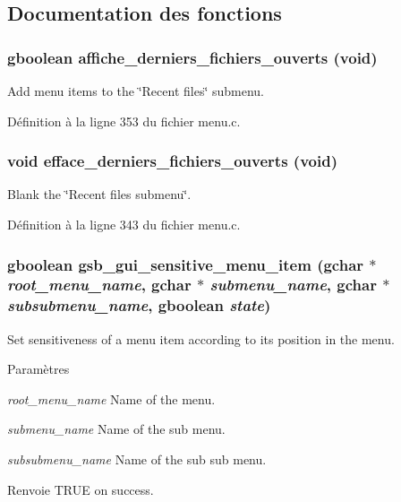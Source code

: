 \subsection{Documentation des fonctions}
\subsubsection[{affiche\_\-derniers\_\-fichiers\_\-ouverts}]{\setlength{\rightskip}{0pt plus 5cm}gboolean affiche\_\-derniers\_\-fichiers\_\-ouverts (void)}\label{menu_8c_a7b48dc605d99995e31545dc3bdad1d85}
Add menu items to the \char`\"{}Recent files\char`\"{} submenu. 

Définition à la ligne 353 du fichier menu.c.

\subsubsection[{efface\_\-derniers\_\-fichiers\_\-ouverts}]{\setlength{\rightskip}{0pt plus 5cm}void efface\_\-derniers\_\-fichiers\_\-ouverts (void)}\label{menu_8c_a31e1f092a06fca742e15442a4fd44313}
Blank the \char`\"{}Recent files submenu\char`\"{}. 

Définition à la ligne 343 du fichier menu.c.

\subsubsection[{gsb\_\-gui\_\-sensitive\_\-menu\_\-item}]{\setlength{\rightskip}{0pt plus 5cm}gboolean gsb\_\-gui\_\-sensitive\_\-menu\_\-item (gchar $\ast$ {\em root\_\-menu\_\-name}, \/  gchar $\ast$ {\em submenu\_\-name}, \/  gchar $\ast$ {\em subsubmenu\_\-name}, \/  gboolean {\em state})}\label{menu_8c_ad3557028823b3fd30c4d7367b698d2e2}
Set sensitiveness of a menu item according to its position in the menu.


\begin{DoxyParams}{Paramètres}
\item[{\em root\_\-menu\_\-name}]Name of the menu. \item[{\em submenu\_\-name}]Name of the sub menu. \item[{\em subsubmenu\_\-name}]Name of the sub sub menu.\end{DoxyParams}
\begin{DoxyReturn}{Renvoie}
TRUE on success. 
\end{DoxyReturn}


